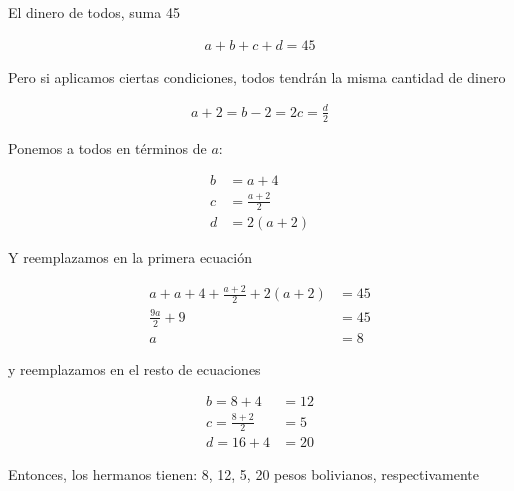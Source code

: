 El dinero de todos, suma 45

\begin{align*}
  a + b +c+d=45
\end{align*}

Pero si aplicamos ciertas condiciones, todos tendrán la misma cantidad de dinero

\begin{align*}
  a+2 = b-2 = 2c = \frac{d}{2}
\end{align*}

Ponemos a todos en términos de $a$:

\begin{align*}
  b&=a+4 \\
  c&=\frac{a+2}{2} \\
  d&=2(a+2)
\end{align*}

Y reemplazamos en la primera ecuación

\begin{align*}
  a + a+4+\frac{a+2}{2}+2(a+2) &= 45 \\
  \frac{9a}{2} + 9 &= 45 \\
  a &=8
\end{align*}

y reemplazamos en el resto de ecuaciones

\begin{align*}
  b = 8+4 &= 12 \\
  c = \frac{8+2}{2} &= 5 \\
  d = 16 + 4 &= 20
\end{align*}

Entonces, los hermanos tienen: 8, 12, 5, 20 pesos bolivianos, respectivamente
